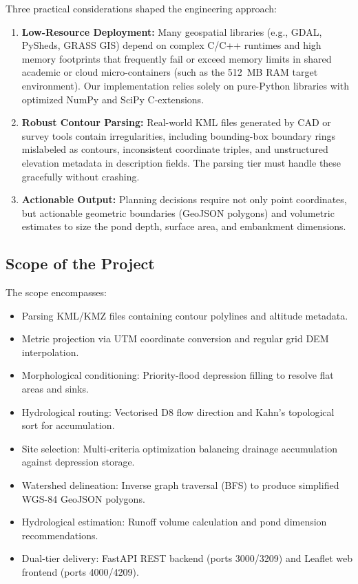 \documentclass[manuscript,screen,review]{acmart}
\begin{document}
Three practical considerations shaped the engineering approach:
\begin{enumerate}
  \item \textbf{Low-Resource Deployment:} Many geospatial libraries (e.g., GDAL, PySheds,
    GRASS GIS) depend on complex C/C++ runtimes and high memory footprints that frequently fail
    or exceed memory limits in shared academic or cloud micro-containers (such as the 512~MB RAM
    target environment). Our implementation relies solely on pure-Python libraries with optimized
    NumPy and SciPy C-extensions.
  \item \textbf{Robust Contour Parsing:} Real-world KML files generated by CAD or survey tools
    contain irregularities, including bounding-box boundary rings mislabeled as contours,
    inconsistent coordinate triples, and unstructured elevation metadata in description fields.
    The parsing tier must handle these gracefully without crashing.
  \item \textbf{Actionable Output:} Planning decisions require not only point coordinates, but
    actionable geometric boundaries (GeoJSON polygons) and volumetric estimates to size the pond
    depth, surface area, and embankment dimensions.
\end{enumerate}

\subsection{Scope of the Project}

The scope encompasses:
\begin{itemize}
  \item Parsing KML/KMZ files containing contour polylines and altitude metadata.
  \item Metric projection via UTM coordinate conversion and regular grid DEM interpolation.
  \item Morphological conditioning: Priority-flood depression filling to resolve flat areas and sinks.
  \item Hydrological routing: Vectorised D8 flow direction and Kahn's topological sort for accumulation.
  \item Site selection: Multi-criteria optimization balancing drainage accumulation against depression storage.
  \item Watershed delineation: Inverse graph traversal (BFS) to produce simplified WGS-84 GeoJSON polygons.
  \item Hydrological estimation: Runoff volume calculation and pond dimension recommendations.
  \item Dual-tier delivery: FastAPI REST backend (ports 3000/3209) and Leaflet web frontend (ports 4000/4209).
\end{itemize}
\end{document}
